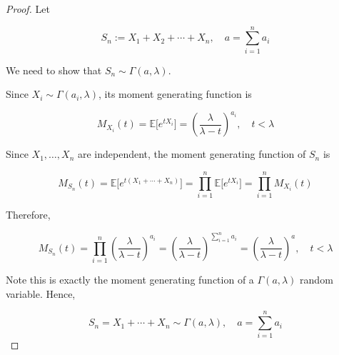 \documentclass{qlnotes-export}
\begin{document}
\begin{proof}

Let

\[S_{n} := X_{1} + X_{2} + \cdots + X_{n},\quad a = \sum\limits_{i = 1}^{n}a_{i}\]

We need to show that \(S_{n} \sim \Gamma(a,\lambda)\).

Since \(X_{i} \sim \Gamma(a_{i},\lambda)\), its moment generating function is

\[M_{X_{i}}(t) = {\mathbb{E}}\lbrack e^{tX_{i}}\rbrack = \left( \frac{\lambda}{\lambda - t} \right)^{a_{i}},\quad t < \lambda\]

Since \(X_{1},\ldots,X_{n}\) are independent, the moment generating function of \(S_{n}\) is

\[M_{S_{n}}(t) = {\mathbb{E}}\lbrack e^{t(X_{1} + \cdots + X_{n})}\rbrack = \prod\limits_{i = 1}^{n}{\mathbb{E}}\lbrack e^{tX_{i}}\rbrack = \prod\limits_{i = 1}^{n}M_{X_{i}}(t)\]

Therefore,

\[M_{S_{n}}(t) = \prod\limits_{i = 1}^{n}\left( \frac{\lambda}{\lambda - t} \right)^{a_{i}} = \left( \frac{\lambda}{\lambda - t} \right)^{\sum_{i = 1}^{n}a_{i}} = \left( \frac{\lambda}{\lambda - t} \right)^{a},\quad t < \lambda\]

Note this is exactly the moment generating function of a \(\Gamma(a,\lambda)\) random variable. Hence,

\[S_{n} = X_{1} + \cdots + X_{n} \sim \Gamma(a,\lambda),\quad a = \sum\limits_{i = 1}^{n}a_{i}\]

\end{proof}
\end{document}
